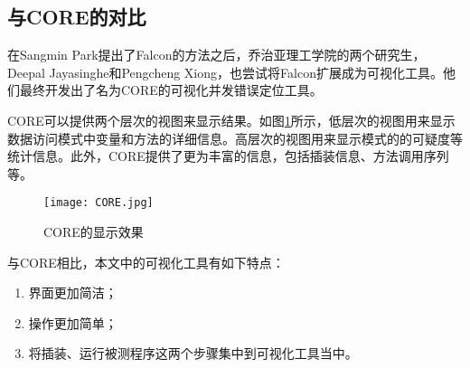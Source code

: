 \subsection{与CORE的对比}
在Sangmin Park提出了Falcon的方法之后，乔治亚理工学院的两个研究生，Deepal Jayasinghe和Pengcheng Xiong，也尝试将Falcon扩展成为可视化工具。他们最终开发出了名为CORE的可视化并发错误定位工具\cite{CORE}。\par
CORE可以提供两个层次的视图来显示结果。如图\ref{pic:core}所示，低层次的视图用来显示数据访问模式中变量和方法的详细信息。高层次的视图用来显示模式的的可疑度等统计信息。此外，CORE提供了更为丰富的信息，包括插装信息、方法调用序列等。
\begin{figure}[!ht]
  \centering
  \texttt{[image: CORE.jpg]}\\
  \caption{CORE的显示效果}\label{pic:core}
\end{figure}
与CORE相比，本文中的可视化工具有如下特点：
\begin{enumerate}
  \item 界面更加简洁；
  \item 操作更加简单；
  \item 将插装、运行被测程序这两个步骤集中到可视化工具当中。
\end{enumerate}
